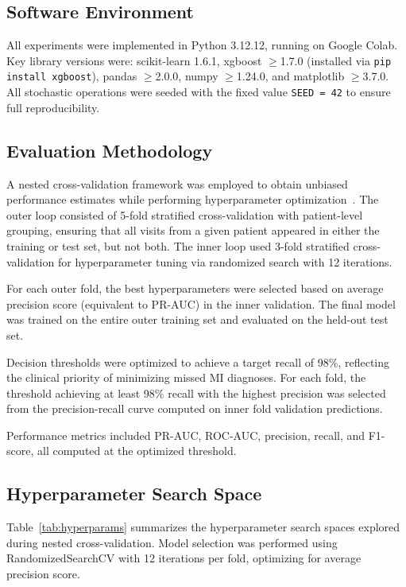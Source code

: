 \documentclass[fleqn,10pt,lineno]{wlpeerj}
\begin{document}
\subsection*{Software Environment}

All experiments were implemented in Python 3.12.12, running on Google Colab. Key library versions were: scikit-learn 1.6.1, xgboost $\geq$1.7.0 (installed via \texttt{pip install xgboost}), pandas $\geq$2.0.0, numpy $\geq$1.24.0, and matplotlib $\geq$3.7.0. All stochastic operations were seeded with the fixed value \texttt{SEED = 42} to ensure full reproducibility.

\subsection*{Evaluation Methodology}

A nested cross-validation framework was employed to obtain unbiased performance estimates while performing hyperparameter optimization~\citep{Cawley2010}. The outer loop consisted of 5-fold stratified cross-validation with patient-level grouping, ensuring that all visits from a given patient appeared in either the training or test set, but not both. The inner loop used 3-fold stratified cross-validation for hyperparameter tuning via randomized search with 12 iterations.

For each outer fold, the best hyperparameters were selected based on average precision score (equivalent to PR-AUC) in the inner validation. The final model was trained on the entire outer training set and evaluated on the held-out test set.

Decision thresholds were optimized to achieve a target recall of 98\%, reflecting the clinical priority of minimizing missed MI diagnoses. For each fold, the threshold achieving at least 98\% recall with the highest precision was selected from the precision-recall curve computed on inner fold validation predictions.

Performance metrics included PR-AUC, ROC-AUC, precision, recall, and F1-score, all computed at the optimized threshold.

\subsection*{Hyperparameter Search Space}

Table~\ref{tab:hyperparams} summarizes the hyperparameter search spaces explored during nested cross-validation. Model selection was performed using RandomizedSearchCV with 12 iterations per fold, optimizing for average precision score.
\end{document}
